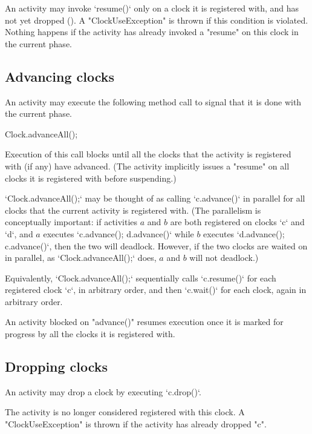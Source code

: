 An activity may invoke \xcd`resume()` only on a clock it is registered with,
and has not yet dropped (). A
\xcd"ClockUseException" is thrown if this
condition is violated. Nothing happens if the activity has already invoked a
\xcd"resume" on this clock in the current phase.

\subsection{Advancing clocks}\label{sec:clock:next}
An activity may execute the following method call to signal that it is done
with the current phase.
\begin{xten}
Clock.advanceAll();
\end{xten}

\noindent 
Execution of this call blocks until all the clocks that the
activity is registered with (if any) have advanced. (The activity
implicitly issues a \xcd"resume" on all clocks it is registered
with before suspending.)

\xcd`Clock.advanceAll();` may be thought of as calling \xcd`c.advance()` in parallel for all
clocks that the current activity is registered with.  (The parallelism is
conceptually important: if activities {$a$} and {$b$} are both
registered on clocks \xcd`c` and \xcd`d`, and {$a$} executes
\xcd`c.advance(); d.advance()` while {$b$} executes \xcd`d.advance(); c.advance()`,
then the two will deadlock.  However, if the two clocks are waited on in
parallel, as \xcd`Clock.advanceAll();` does, {$a$} and {$b$} will not deadlock.)

Equivalently, \xcd`Clock.advanceAll();` sequentially calls \xcd`c.resume()` for each
registered clock \xcd`c`, in arbitrary order, and then \xcd`c.wait()` for each
clock, again in arbitrary order.  



An activity blocked on \xcd"advance()" resumes execution once
it is marked for progress by all the clocks it is registered with.

\subsection{Dropping clocks}\label{sec:clock:drop}
An activity may drop a clock by executing \xcd`c.drop()`.



\noindent{} The activity is no longer considered registered with this
clock.  A \xcd"ClockUseException" is thrown if the activity has
already dropped \xcd"c".

